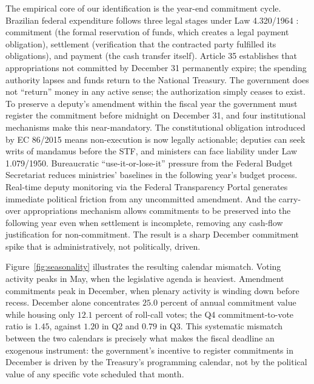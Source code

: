 \documentclass[pdflatex,sn-basic]{sn-jnl}
\begin{document}
The empirical core of our identification is the year-end commitment cycle. Brazilian federal expenditure follows three legal stages under Law 4.320/1964 \citep{Lei4320}: commitment (the formal reservation of funds, which creates a legal payment obligation), settlement (verification that the contracted party fulfilled its obligations), and payment (the cash transfer itself). Article 35 establishes that appropriations not committed by December 31 permanently expire; the spending authority lapses and funds return to the National Treasury. The government does not ``return'' money in any active sense; the authorization simply ceases to exist. To preserve a deputy's amendment within the fiscal year the government must register the commitment before midnight on December 31, and four institutional mechanisms make this near-mandatory. The constitutional obligation introduced by EC 86/2015 means non-execution is now legally actionable; deputies can seek writs of mandamus before the STF, and ministers can face liability under Law 1.079/1950. Bureaucratic ``use-it-or-lose-it'' pressure from the Federal Budget Secretariat reduces ministries' baselines in the following year's budget process. Real-time deputy monitoring via the Federal Transparency Portal generates immediate political friction from any uncommitted amendment. And the carry-over appropriations mechanism allows commitments to be preserved into the following year even when settlement is incomplete, removing any cash-flow justification for non-commitment. The result is a sharp December commitment spike that is administratively, not politically, driven.

Figure~\ref{fig:seasonality} illustrates the resulting calendar mismatch. Voting activity peaks in May, when the legislative agenda is heaviest. Amendment commitments peak in December, when plenary activity is winding down before recess. December alone concentrates $25.0$ percent of annual commitment value while housing only $12.1$ percent of roll-call votes; the Q4 commitment-to-vote ratio is $1.45$, against $1.20$ in Q2 and $0.79$ in Q3. This systematic mismatch between the two calendars is precisely what makes the fiscal deadline an exogenous instrument: the government's incentive to register commitments in December is driven by the Treasury's programming calendar, not by the political value of any specific vote scheduled that month.
\end{document}
